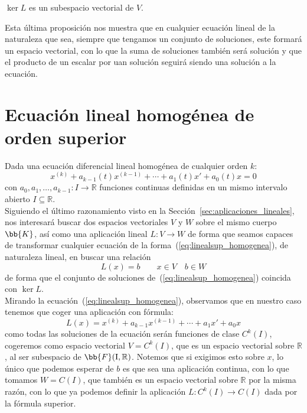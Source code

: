 \begin{prop}
    $\ker L$ es un subespacio vectorial de $V$.
\end{prop}
Esta última proposición nos muestra que en cualquier ecuación lineal de la naturaleza que sea, siempre que tengamos un conjunto de soluciones, este formará un espacio vectorial, con lo que la suma de soluciones también será solución y que el producto de un escalar por uan solución seguirá siendo una solución a la ecuación.

\section{Ecuación lineal homogénea de orden superior}
Dada una ecuación diferencial lineal homogénea de cualquier orden $k$:
\begin{equation}\label{eq:linealsup_homogenea}
    x^{(k)} + a_{k-1}(t) x^{(k-1)} + \cdots + a_1(t)x' + a_0(t) x = 0
\end{equation}
con $a_0,a_1,\ldots,a_{k-1}:I\rightarrow\mathbb{R}$ funciones continuas definidas en un mismo intervalo abierto $I\subseteq \mathbb{R}$.\\

Siguiendo el último razonamiento visto en la Sección~\ref{sec:aplicaciones_lineales}, nos interesará buscar dos espacios vectoriales $V$ y $W$ sobre el mismo cuerpo $\bb{K}$, así como una aplicación lineal $L:V\rightarrow W$ de forma que seamos capaces de transformar cualquier ecuación de la forma~(\ref{eq:linealsup_homogenea}), de naturaleza lineal, en buscar una relación
\begin{equation*}
    L(x) = b \qquad x\in V \quad b\in W
\end{equation*}
de forma que el conjunto de soluciones de~(\ref{eq:linealsup_homogenea}) coincida con $\ker L$.\\

Mirando la ecuación~(\ref{eq:linealsup_homogenea}), observamos que en nuestro caso tenemos que coger una aplicación con fórmula:
\begin{equation*}
    L(x) = x^{(k)} + a_{k-1} x^{(k-1)} + \cdots + a_1x' + a_0 x 
\end{equation*}
como todas las soluciones de la ecuación serán funciones de clase $C^k(I)$, cogeremos como espacio vectorial $V=C^k(I)$, que es un espacio vectorial sobre $\mathbb{R}$, al ser subespacio de $\bb{F}(\text{I},\mathbb{R})$. Notemos que si exigimos esto sobre $x$, lo único que podemos esperar de $b$ es que sea una aplicación continua, con lo que tomamos $W = C(I)$, que también es un espacio vectorial sobre $\mathbb{R}$ por la misma razón, con lo que ya podemos definir la aplicación $L:C^k(I)\rightarrow C(I)$ dada por la fórmula superior.

